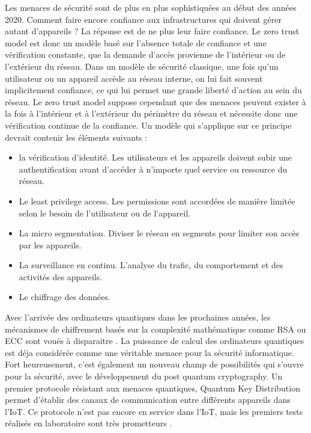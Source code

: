 Les menaces de sécurité sont de plus en plus sophistiquées au début des années 2020. Comment faire encore confiance aux infrastructures qui doivent gérer autant d'appareils ? La réponse est de ne plus leur faire confiance. Le zero trust model est donc un modèle basé sur l'absence totale de confiance et une vérification constante, que la demande d'accès provienne de l'intérieur ou de l'extérieur du réseau. Dans un modèle de sécurité classique, une fois qu'un utilisateur ou un appareil accède au réseau interne, on lui fait souvent implicitement confiance, ce qui lui permet une grande liberté d'action au sein du réseau. Le zero trust model suppose cependant que des menaces peuvent exister à la fois à l’intérieur et à l’extérieur du périmètre du réseau et nécessite donc une vérification continue de la confiance. Un modèle qui s'applique sur ce principe devrait contenir les éléments suivants \cite{zero1} :
\begin{itemize}
\item la vérification d'identité. Les utilisateurs et les appareils doivent subir une authentification avant d'accéder à n'importe quel service ou ressource du réseau.
\item Le least privilege access. Les permissions sont accordées de manière limitée selon le besoin de l'utilisateur ou de l'appareil.
\item La micro segmentation. Diviser le réseau en segments pour limiter son accès par les appareils.
\item La surveillance en continu. L'analyse du trafic, du comportement et des activités des appareils.
\item Le chiffrage des données.
\end{itemize}

\vspace{0.1cm}


Avec l'arrivée des ordinateurs quantiques dans les prochaines années, les mécanismes de chiffrement basés sur la complexité mathématique comme \ac{RSA} ou \ac{ECC} sont voués à disparaitre  \cite{quantumcrypto}. La puissance de calcul des ordinateurs quantiques est déja considérée comme une véritable menace pour la sécurité informatique. Fort heureusement, c'est également un nouveau champ de possibilités qui s'ouvre pour la sécurité, avec le développement du post quantum cryptography. Un premier protocole résistant aux menaces quantiques, Quantum Key Distribution permet d'établir des canaux de communication entre différents appareils dans l'\ac{IoT}. Ce protocole n'est pas encore en service dans l'\ac{IoT}, mais les premiers tests réalisés en laboratoire sont très prometteurs \cite{qinternet}.